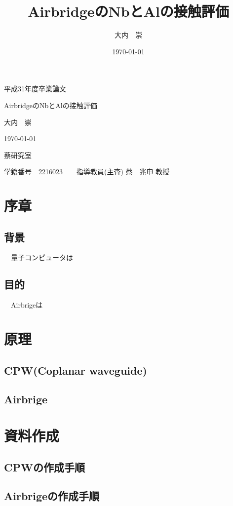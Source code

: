 \documentclass[a4paper,11pt,oneside,openany]{jsbook}
\title{AirbridgeのNbとAlの接触評価}
\author{大内　崇}
\date{\today}
\begin{document}
\begin{center}
  \huge 平成31年度卒業論文\par
  \vspace{15mm}
  \huge AirbridgeのNbとAlの接触評価 \par
  \vspace{15mm}
  \LARGE 大内　崇 \par
  \vspace{100mm}
  \Large \today \par
  \vspace{15mm}
  \Large 蔡研究室 \par
  \vspace{10mm}
  \Large 学籍番号　2216023　　指導教員(主査) 蔡　兆申 教授\par
  \vspace{10mm}
\end{center}
\thispagestyle{empty}
\clearpage
\addtocounter{page}{-1}
\newpage
\setcounter{tocdepth}{3}
%
\tableofcontents
%
\chapter{序章}
\section{背景}
　量子コンピュータは
\section{目的}
　Airbrigeは

\chapter{原理}
\section{CPW(Coplanar waveguide)}
\section{Airbrige}

\chapter{資料作成}
\section{CPWの作成手順}
\section{Airbrigeの作成手順}
\end{document}
